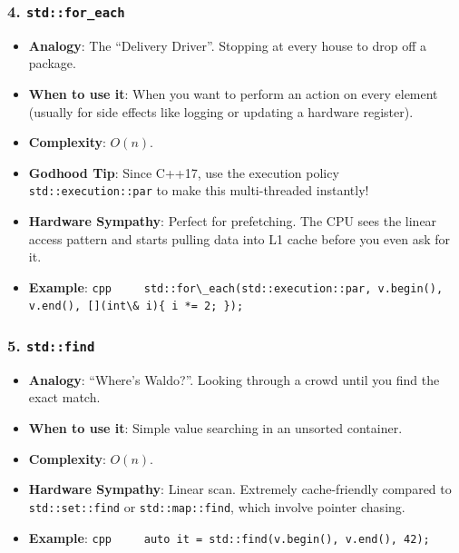 \hypertarget{stdfor_each}{%
\subsubsection{\texorpdfstring{4.
\texttt{std::for\_each}}{4. std::for\_each}}\label{stdfor_each}}

\begin{itemize}
\tightlist
\item
  \textbf{Analogy}: The ``Delivery Driver''. Stopping at every house to
  drop off a package.
\item
  \textbf{When to use it}: When you want to perform an action on every
  element (usually for side effects like logging or updating a hardware
  register).
\item
  \textbf{Complexity}: \(O(n)\).
\item
  \textbf{Godhood Tip}: Since C++17, use the execution policy
  \passthrough{\lstinline!std::execution::par!} to make this
  multi-threaded instantly!
\item
  \textbf{Hardware Sympathy}: Perfect for prefetching. The CPU sees the
  linear access pattern and starts pulling data into L1 cache before you
  even ask for it.
\item
  \textbf{Example}:
  \passthrough{\lstinline!cpp     std::for\_each(std::execution::par, v.begin(), v.end(), [](int\& i)\{ i *= 2; \});!}
\end{itemize}

\hypertarget{stdfind}{%
\subsubsection{\texorpdfstring{5.
\texttt{std::find}}{5. std::find}}\label{stdfind}}

\begin{itemize}
\tightlist
\item
  \textbf{Analogy}: ``Where's Waldo?''. Looking through a crowd until
  you find the exact match.
\item
  \textbf{When to use it}: Simple value searching in an unsorted
  container.
\item
  \textbf{Complexity}: \(O(n)\).
\item
  \textbf{Hardware Sympathy}: Linear scan. Extremely cache-friendly
  compared to \passthrough{\lstinline!std::set::find!} or
  \passthrough{\lstinline!std::map::find!}, which involve pointer
  chasing.
\item
  \textbf{Example}:
  \passthrough{\lstinline!cpp     auto it = std::find(v.begin(), v.end(), 42);!}
\end{itemize}

